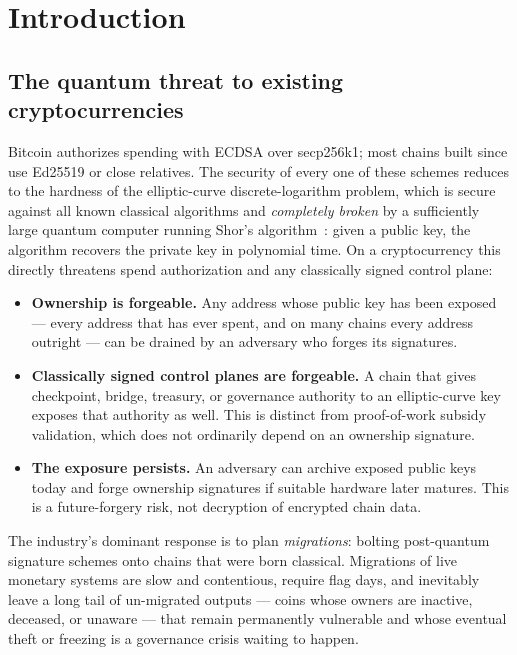 \documentclass[11pt,a4paper]{article}
\begin{document}
\setcounter{tocdepth}{2}
\tableofcontents
\newpage

\section{Introduction}\label{sec:intro}

\subsection{The quantum threat to existing cryptocurrencies}

Bitcoin authorizes spending with ECDSA over secp256k1; most chains built since
use Ed25519 or close relatives. The security of every one of these schemes
reduces to the hardness of the elliptic-curve discrete-logarithm problem,
which is secure against all known classical algorithms and \emph{completely
broken} by a sufficiently large quantum computer running Shor's
algorithm~\cite{shor}: given a public key, the algorithm recovers the private
key in polynomial time. On a cryptocurrency this directly threatens spend
authorization and any classically signed control plane:

\begin{itemize}
\item \textbf{Ownership is forgeable.} Any address whose public key has been
      exposed --- every address that has ever spent, and on many chains every
      address outright --- can be drained by an adversary who forges its
      signatures.
\item \textbf{Classically signed control planes are forgeable.} A chain that
      gives checkpoint, bridge, treasury, or governance authority to an
      elliptic-curve key exposes that authority as well. This is distinct from
      proof-of-work subsidy validation, which does not ordinarily depend on an
      ownership signature.
\item \textbf{The exposure persists.} An adversary can archive exposed public
      keys today and forge ownership signatures if suitable hardware later
      matures. This is a future-forgery risk, not decryption of encrypted chain
      data.
\end{itemize}

The industry's dominant response is to plan \emph{migrations}: bolting
post-quantum signature schemes onto chains that were born classical.
Migrations of live monetary systems are slow and contentious, require flag
days, and inevitably leave a long tail of un-migrated outputs --- coins whose
owners are inactive, deceased, or unaware --- that remain permanently
vulnerable and whose eventual theft or freezing is a governance crisis waiting
to happen.
\end{document}
